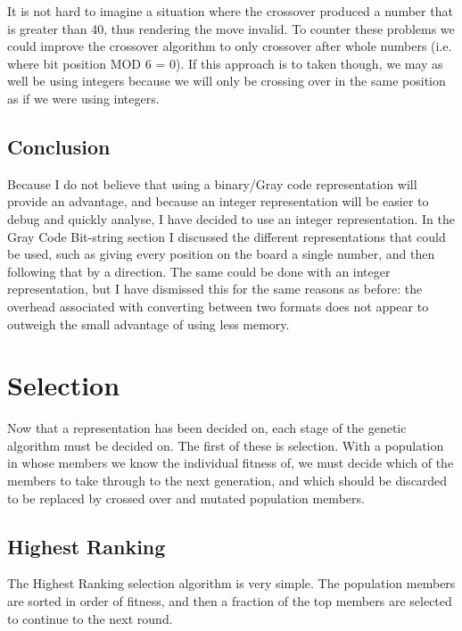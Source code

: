 \documentclass[]{report}
\begin{document}
It is not hard to imagine a situation where the crossover produced a number that is greater than 40, thus rendering the move invalid. To counter these problems we could improve the crossover algorithm to only crossover after whole numbers (i.e. where bit position MOD 6 = 0). If this approach is to taken though, we may as well be using integers because we will only be crossing over in the same position as if we were using integers. \\

\subsection{Conclusion}

Because I do not believe that using a binary/Gray code representation will provide an advantage, and because an integer representation will be easier to debug and quickly analyse, I have decided to use an integer representation. In the Gray Code Bit-string section I discussed the different representations that could be used, such as giving every position on the board a single number, and then following that by a direction. The same could be done with an integer representation, but I have dismissed this for the same reasons as before: the overhead associated with converting between two formats does not appear to outweigh the small advantage of using less memory. \\

\section{Selection}
Now that a representation has been decided on, each stage of the genetic algorithm must be decided on. The first of these is selection. With a population in whose members we know the individual fitness of, we must decide which of the members to take through to the next generation, and which should be discarded to be replaced by crossed over and mutated population members.

\subsection{Highest Ranking}

The Highest Ranking selection algorithm is very simple. The population members are sorted in order of fitness, and then a fraction of the top members are selected to continue to the next round. \\
\end{document}
